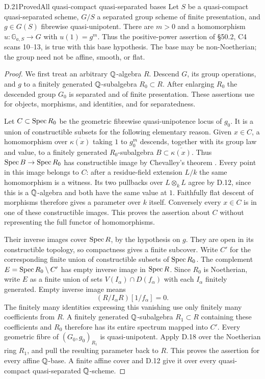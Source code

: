 \begin{statement}{D.21}{Proved}{All quasi-compact quasi-separated bases}
Let $S$ be a quasi-compact quasi-separated scheme, $G/S$ a
separated group scheme of finite presentation, and $g\in G(S)$
fibrewise quasi-unipotent. There are $m>0$ and a homomorphism
$u:\mathbb G_{a,S}\to G$ with $u(1)=g^m$.
Thus the positive-power assertion of \S50.2, C4 scans 10--13,
is true with this base hypothesis. The base may be non-Noetherian;
the group need not be affine, smooth, or flat.
\end{statement}
\begin{proof}
We first treat an arbitrary $\mathbb Q$-algebra $R$. Descend $G$, its
group operations, and $g$ to a finitely generated $\mathbb Q$-subalgebra
$R_0\subset R$. After enlarging $R_0$ the descended group $G_0$
is separated and of finite presentation. These assertions use
\citet[Lemma 32.10.1, Tag 01ZM]{DN_StacksLimits} for objects,
morphisms, and identities, and
\citet[Lemma 32.8.6, Tag 01ZQ]{DS_StacksSeparatedLimit} for
separatedness.

Let $C\subset\operatorname{Spec} R_0$ be the geometric fibrewise
quasi-unipotence locus of $g_0$. It is a union of constructible
subsets for the following elementary reason. Given $x\in C$,
a homomorphism over $\overline{\kappa(x)}$ taking $1$ to
$g_0^m$ descends, together with its group law and value, to a
finitely generated $R_0$-subalgebra
$B\subset\overline{\kappa(x)}$. Thus $\operatorname{Spec} B\to\operatorname{Spec} R_0$
has constructible image by Chevalley's theorem
\citep[Theorem 29.23.3, Tag 054K]{DS_StacksChevalley}.
Every point in this image belongs to $C$: after a residue-field
extension $L/k$ the same homomorphism is a witness. Its two
pullbacks over $L\otimes_k L$ agree by D.12, since this is
a $\mathbb Q$-algebra and both have the same value at $1$. Faithfully
flat descent of morphisms therefore gives a parameter over $k$
itself. Conversely every $x\in C$ is in one
of these constructible images. This proves the assertion about
$C$ without representing the full functor of homomorphisms.

Their inverse images cover $\operatorname{Spec} R$, by the hypothesis on $g$.
They are open in its constructible topology, so compactness
\citep[Lemma 5.23.2, Tag 0901]{DN_StacksConstructible} gives
a finite subcover. Write $C'$ for the corresponding finite
union of constructible subsets of $\operatorname{Spec} R_0$. The complement
$E=\operatorname{Spec} R_0\setminus C'$ has empty inverse image in $\operatorname{Spec} R$.
Since $R_0$ is Noetherian, write $E$ as a finite union of sets
$V(I_\alpha)\cap D(f_\alpha)$ with each $I_\alpha$ finitely
generated. Empty inverse image means
\[
                      (R/I_\alpha R)[1/f_\alpha]=0.
\]
The finitely many identities expressing this vanishing use
only finitely many coefficients from $R$. A finitely generated
$\mathbb Q$-subalgebra $R_1\subset R$ containing these coefficients
and $R_0$ therefore has its entire spectrum mapped into $C'$.
Every geometric fibre of $(G_0,g_0)_{R_1}$ is quasi-unipotent.
Apply D.18 over the Noetherian ring $R_1$, and pull the resulting
parameter back to $R$. This proves the assertion for every
affine $\mathbb Q$-base. A finite affine cover and D.12 give it over
every quasi-compact quasi-separated $\mathbb Q$-scheme.


\end{proof}

